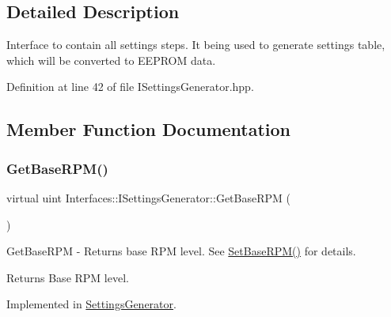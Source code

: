 \subsection{Detailed Description}
Interface to contain all settings steps. It being used to generate settings table, which will be converted to E\+E\+P\+R\+OM data. 

Definition at line 42 of file I\+Settings\+Generator.\+hpp.



\subsection{Member Function Documentation}
\mbox{\label{class_interfaces_1_1_i_settings_generator_ad088253da57b2ee0b94fe6fd1fb2dfdd}} 
\subsubsection{\texorpdfstring{Get\+Base\+R\+P\+M()}{GetBaseRPM()}}
{\footnotesize\ttfamily virtual uint Interfaces\+::\+I\+Settings\+Generator\+::\+Get\+Base\+R\+PM (\begin{DoxyParamCaption}{ }\end{DoxyParamCaption})\hspace{0.3cm}{\ttfamily [pure virtual]}}



Get\+Base\+R\+PM -\/ Returns base R\+PM level. See \hyperlink{class_interfaces_1_1_i_settings_generator_a4caf07447d0930440d9f21318892244c}{Set\+Base\+R\+P\+M()} for details. 

\begin{DoxyReturn}{Returns}
Base R\+PM level. 
\end{DoxyReturn}


Implemented in \hyperlink{class_settings_generator_a99bbe6e67e638ccc7bf6b21b3bc36135}{Settings\+Generator}.

\mbox{\label{class_interfaces_1_1_i_settings_generator_a9cc36185b446f21e09a0e5633f39a1c5}} 
